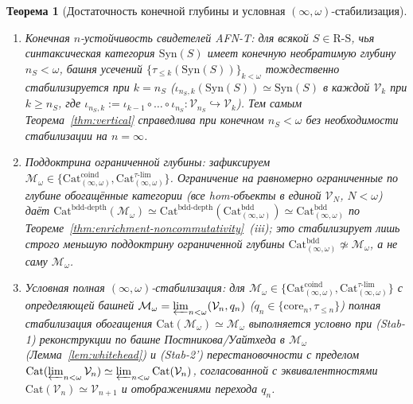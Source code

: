\documentclass[11pt]{article}
\theoremstyle{plain}
\newtheorem{theorem}{Теорема}[section]
\theoremstyle{definition}
\newcommand{\RS}{\mathrm{R\text{-}S}}
\newcommand{\Cat}{\mathrm{Cat}}
\newcommand{\Syn}{\mathrm{Syn}}
\begin{document}
\begin{theorem}[Достаточность конечной глубины и условная $(\infty, \omega)$-стабилизация]\label{thm:cond-infty-stab}
\begin{enumerate}[nosep,label=(\roman*)]
\item \emph{Конечная $n$-устойчивость свидетелей AFN-T}: для всякой $S \in \RS$, чья синтаксическая категория $\Syn(S)$ имеет конечную необратимую глубину $n_S < \omega$, башня усечений $\{\tau_{\le k}(\Syn(S))\}_{k < \omega}$ тождественно стабилизируется при $k = n_S$ ($\iota_{n_S, k}(\Syn(S)) \simeq \Syn(S)$ в каждой $\mathcal{V}_k$ при $k \ge n_S$, где $\iota_{n_S, k} := \iota_{k-1} \circ \dots \circ \iota_{n_S} : \mathcal{V}_{n_S} \hookrightarrow \mathcal{V}_k$). Тем самым Теорема~\ref{thm:vertical} справедлива при конечном $n_S < \omega$ без необходимости стабилизации на $n = \infty$.
\item[\textup{(ii-a)}] \emph{Поддоктрина ограниченной глубины}: зафиксируем $\mathcal{M}_\omega \in \{\Cat_{(\infty,\omega)}^{\mathrm{coind}}, \Cat_{(\infty,\omega)}^{\tau\text{-}\mathrm{lim}}\}$. Ограничение на равномерно ограниченные по глубине обогащённые категории (все hom-объекты в единой $\mathcal{V}_N$, $N < \omega$) даёт $\Cat^{\mathrm{bdd\text{-}depth}}(\mathcal{M}_\omega) \simeq \Cat^{\mathrm{bdd\text{-}depth}}(\Cat_{(\infty,\omega)}^{\mathrm{bdd}}) \simeq \Cat_{(\infty,\omega)}^{\mathrm{bdd}}$ по Теореме~\ref{thm:enrichment-noncommutativity}~(iii); это стабилизирует лишь строго меньшую поддоктрину ограниченной глубины $\Cat_{(\infty,\omega)}^{\mathrm{bdd}} \not\simeq \mathcal{M}_\omega$, а не саму $\mathcal{M}_\omega$.
\item[\textup{(ii-b)}] \emph{Условная полная $(\infty, \omega)$-стабилизация}: для $\mathcal{M}_\omega \in \{\Cat_{(\infty,\omega)}^{\mathrm{coind}}, \Cat_{(\infty,\omega)}^{\tau\text{-}\mathrm{lim}}\}$ с определяющей башней $\mathcal{M}_\omega = \varprojlim_{n < \omega} (\mathcal{V}_n, q_n)$ ($q_n \in \{\mathrm{core}_n, \tau_{\le n}\}$) полная стабилизация обогащения $\Cat(\mathcal{M}_\omega) \simeq \mathcal{M}_\omega$ выполняется условно при \textup{(Stab-1)} реконструкции по башне Постникова/Уайтхеда в $\mathcal{M}_\omega$ (Лемма~\ref{lem:whitehead}) и \textup{(Stab-2')} перестановочности с пределом $\Cat(\varprojlim_{n < \omega} \mathcal{V}_n) \simeq \varprojlim_{n < \omega} \Cat(\mathcal{V}_n)$, согласованной с эквивалентностями $\Cat(\mathcal{V}_n) \simeq \mathcal{V}_{n+1}$ и отображениями перехода $q_n$.
\end{enumerate}
\end{theorem}
\end{document}

